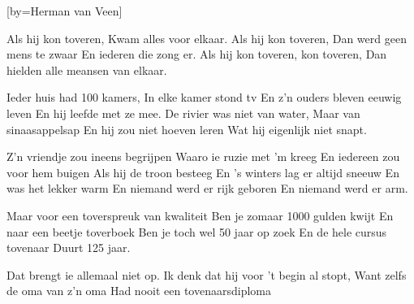 [by={Herman van Veen}]

\beginchorus
Als hij kon toveren,
Kwam alles voor elkaar.
Als hij kon toveren,
Dan werd geen mens te zwaar
En iederen die zong er.
Als hij kon toveren, kon toveren,
Dan hielden alle meansen van elkaar.
\endchorus

\beginverse
Ieder huis had 100 kamers,
In elke kamer stond tv
En z'n ouders bleven eeuwig leven
En hij leefde met ze mee.
De rivier was niet van water,
Maar van sinaasappelsap
En hij zou niet hoeven leren
Wat hij eigenlijk niet snapt.
\endverse

\beginverse
Z'n vriendje zou ineens begrijpen
Waaro ie ruzie met 'm kreeg
En iedereen zou voor hem buigen
Als hij de troon besteeg
En 's winters lag er altijd sneeuw
En was het lekker warm
En niemand werd er rijk geboren
En niemand werd er arm.
\endverse

\beginverse
Maar voor een toverspreuk van kwaliteit
Ben je zomaar 1000 gulden kwijt
En naar een beetje toverboek
Ben je toch wel 50 jaar op zoek
En de hele cursus tovenaar
Duurt 125 jaar.

Dat brengt ie allemaal niet op.
Ik denk dat hij voor 't begin al stopt,
Want zelfs de oma van z'n oma
Had nooit een tovenaarsdiploma
\endverse
\endsong
